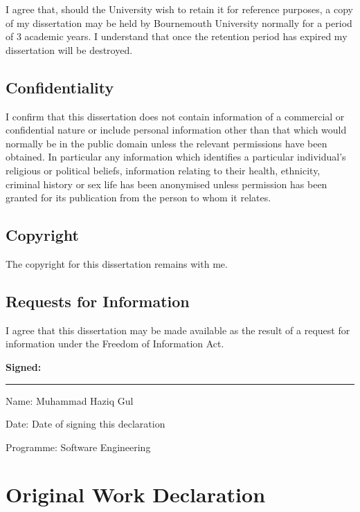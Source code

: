{\linespread{1.0} %
I agree that, should the University wish to retain it for reference purposes, a copy of my dissertation may be held by Bournemouth University normally for a period of 3 academic years. I understand that once the retention period has expired my dissertation will be destroyed.

\section*{Confidentiality}
I confirm that this dissertation does not contain information of a commercial or confidential nature or include personal information other than that which would normally be in the public domain unless the relevant permissions have been obtained. In particular any information which identifies a particular individual's religious or political beliefs, information relating to their health, ethnicity, criminal history or sex life has been anonymised unless permission has been granted for its publication from the person to whom it relates.

\section*{Copyright}
The copyright for this dissertation remains with me.
 
\section*{Requests for Information}
I agree that this dissertation may be made available as the result of a request for information under the Freedom of Information Act.


\vspace{12pt}
\textbf{Signed:}
\hrule width 0.7\textwidth
\vspace{12pt}

Name: Muhammad Haziq Gul
\vspace{3pt}

Date: Date of signing this declaration
\vspace{3pt}

Programme: Software Engineering 
\vspace{3pt}

}







\chapter*{Original Work Declaration}
\thispagestyle{fancy} %


